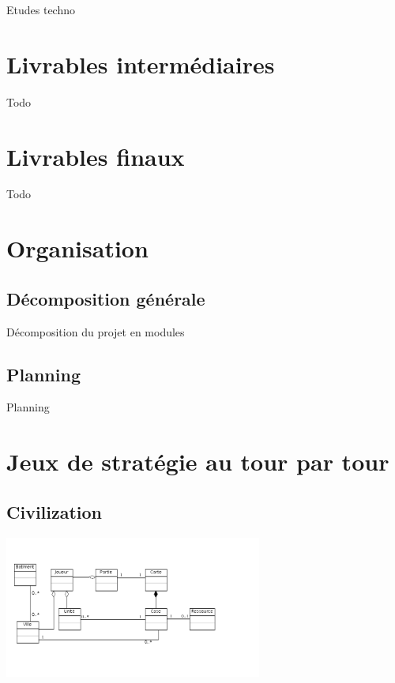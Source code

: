\documentclass[a4paper,10pt]{report}
\begin{document}
      Etudes techno



  \chapter{Livrables intermédiaires}

    Todo



  \chapter{Livrables finaux}

    Todo



  \chapter{Organisation}

    \section{Décomposition générale}

      Décomposition du projet en modules


    \section{Planning}

      Planning


\appendix

\chapter{Jeux de stratégie au tour par tour}

	\section{Civilization}

		\includegraphics[width=320px]{diagrammes/concept_civilization.png}
\end{document}
